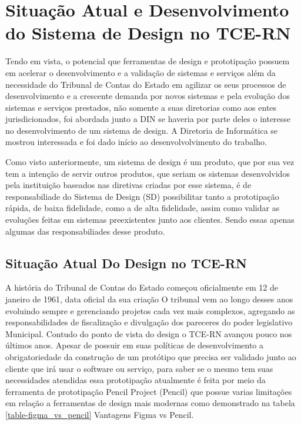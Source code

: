 \chapter[Capítulo 3]{Situação Atual e Desenvolvimento do Sistema de Design no TCE-RN}
\label{ch:cap3}

Tendo em vista, o potencial que ferramentas de design e prototipação possuem em acelerar o desenvolvimento e a validação de sistemas e serviços além da necessidade do Tribunal de Contas do Estado em agilizar os seus processos de desenvolvimento e a crescente demanda por novos sistemas e pela evolução dos sistemas e serviços prestados, não somente a suas diretorias como aos entes jurisdicionados, foi abordada junto a DIN se haveria por parte deles o interesse no desenvolvimento de um sistema de design. A Diretoria de Informática se mostrou interessada e foi dado início ao desenvolvolvimento do trabalho.

Como visto anteriormente, um sistema de design é um produto, que por sua vez tem a intenção de servir outros produtos, que seriam os sistemas desenvolvidos pela instituição baseados nas diretivas criadas por esse sistema, é de responsabiliade do Sistema de Design (SD) possibilitar tanto a prototipação rápida, de baixa fidelidade, como a de alta fidelidade, assim como validar as evoluções feitas em sistemas preexistentes junto aos clientes. Sendo essas apenas algumas das responsabiliades desse produto.

\section{Situação Atual Do Design no TCE-RN} \label{secao31}
A história do Tribunal de Contas do Estado começou oficialmente em 12 de janeiro de 1961, data oficial da sua criação \cite{historia_tribunal} O tribunal vem ao longo desses anos evoluindo sempre e gerenciando projetos cada vez mais complexos, agregando as responsabilidades de fiscalização e divulgação dos pareceres do poder legislativo Municipal. Contudo do ponto de vista do design o TCE-RN avançou pouco nos últimos anos. Apesar de possuir em suas políticas de desenvolvimento a obrigatoriedade da construção de um protótipo que precisa ser validado junto ao cliente que irá usar o software ou serviço, para saber se o mesmo tem suas necessidades atendidas essa prototipação atualmente é feita por meio da ferramenta de prototipação Pencil Project (Pencil) que possue varias limitações em relação a ferramentas de design mais modernas como demonstrado na tabela \ref{table-figma_vs_pencil} Vantagens Figma vs Pencil.

